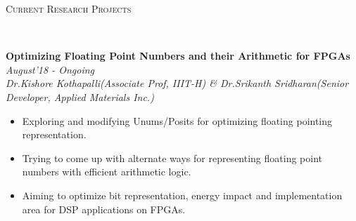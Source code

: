 \documentclass[10pt]{article}
\newenvironment{changemargin}[2]{%
    \begin{list}{}{%
            \setlength{\topsep}{0pt}%
            \setlength{\leftmargin}{#1}%
            \setlength{\rightmargin}{#2}%
            \setlength{\listparindent}{\parindent}%
        \setlength{\itemindent}{\parindent}%
            \setlength{\parsep}{\parskip}%
        }%
\item[]}{\end{list}
}
\newcommand{\lineover}{
    \begin{changemargin}{-0.05in}{-0.10in}
        \vspace*{-8pt}
        \hrulefill \\
        \vspace*{-2pt}
    \end{changemargin}
}
\newcommand{\header}[1]{
    \begin{changemargin}{-0.75in}{-0.75in}
        \scshape{#1}\\
        \lineover
    \end{changemargin}
}
\newenvironment{body} {
    \vspace*{-16pt}
    \begin{changemargin}{-0.6in}{-0.65in}
    }     
    {\end{changemargin}
}
\begin{document}
\smallskip

\header{Current Research Projects}


\begin{body}
    \vspace{14pt}
    \textbf{Optimizing Floating Point Numbers and their Arithmetic for FPGAs} \hfill \emph{August'18 - Ongoing}\\
    \emph{Dr.Kishore Kothapalli(Associate Prof, IIIT-H) \& Dr.Srikanth Sridharan(Senior Developer, Applied Materials Inc.)}
    \begin{itemize}
        \item{Exploring and modifying Unums/Posits for optimizing floating pointing representation.}
        \item{Trying to come up with alternate ways for representing floating point numbers with efficient arithmetic logic.}
        \item{Aiming to optimize bit representation, energy impact and implementation area for DSP applications on FPGAs.}
    \end{itemize}
    \smallskip 
\end{body}
\end{document}

